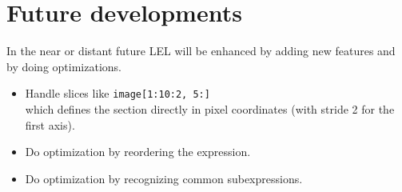 \section{Future developments}
In the near or distant future LEL will be enhanced by adding new
features and by doing optimizations.
\begin{itemize}
  \item Handle slices like \texttt{image[1:10:2, 5:]}
        \\which defines the section directly in pixel coordinates (with
        stride 2 for the first axis).
  \item Do optimization by reordering the expression.
  \item Do optimization by recognizing common subexpressions.
\end{itemize}
